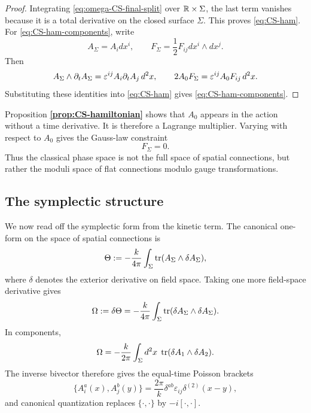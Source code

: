 \begin{proof}
Integrating \eqref{eq:omega-CS-final-split} over $\mathbb{R}\times \Sigma$, the last term vanishes because it is a total derivative on the closed surface $\Sigma$. This proves \eqref{eq:CS-ham}. For \eqref{eq:CS-ham-components}, write
\begin{equation*}
A_\Sigma = A_i dx^i,
\qquad
F_\Sigma = \frac{1}{2}F_{ij}dx^i\wedge dx^j.
\end{equation*}
Then
\begin{equation*}
A_\Sigma\wedge \partial_t A_\Sigma = \varepsilon^{ij}A_i\partial_t A_j\, d^2x,
\qquad
2A_0F_\Sigma = \varepsilon^{ij}A_0F_{ij}\, d^2x.
\end{equation*}
Substituting these identities into \eqref{eq:CS-ham} gives \eqref{eq:CS-ham-components}.
\end{proof}

\medskip

\noindent Proposition \textbf{\ref{prop:CS-hamiltonian}} shows that $A_0$ appears in the action without a time derivative. It is therefore a Lagrange multiplier. Varying with respect to $A_0$ gives the Gauss-law constraint
\begin{equation}\label{eq:Gauss}
F_\Sigma = 0.
\end{equation}
Thus the classical phase space is not the full space of spatial connections, but rather the moduli space of flat connections modulo gauge transformations.

\subsection{The symplectic structure}

We now read off the symplectic form from the kinetic term. The canonical one-form on the space of spatial connections is
\begin{equation}\label{eq:canonical-one-form}
\Theta
:=
-\frac{k}{4\pi}\int_\Sigma \operatorname{tr}(A_\Sigma\wedge \delta A_\Sigma),
\end{equation}
where $\delta$ denotes the exterior derivative on field space. Taking one more field-space derivative gives
\begin{equation}\label{eq:symplectic}
\Omega
:=
\delta\Theta
=
-\frac{k}{4\pi}\int_\Sigma \operatorname{tr}(\delta A_\Sigma\wedge \delta A_\Sigma).
\end{equation}
In components,
\begin{equation*}
\Omega
=
-\frac{k}{2\pi}\int_\Sigma d^2x\; \operatorname{tr}(\delta A_1\wedge \delta A_2).
\end{equation*}
The inverse bivector therefore gives the equal-time Poisson brackets
\begin{equation}\label{eq:CS-commutators}
\{A_i^a(x),A_j^b(y)\}
=
\frac{2\pi}{k}\delta^{ab}\varepsilon_{ij}\delta^{(2)}(x-y),
\end{equation}
and canonical quantization replaces $\{\cdot,\cdot\}$ by $-i[\cdot,\cdot]$.

